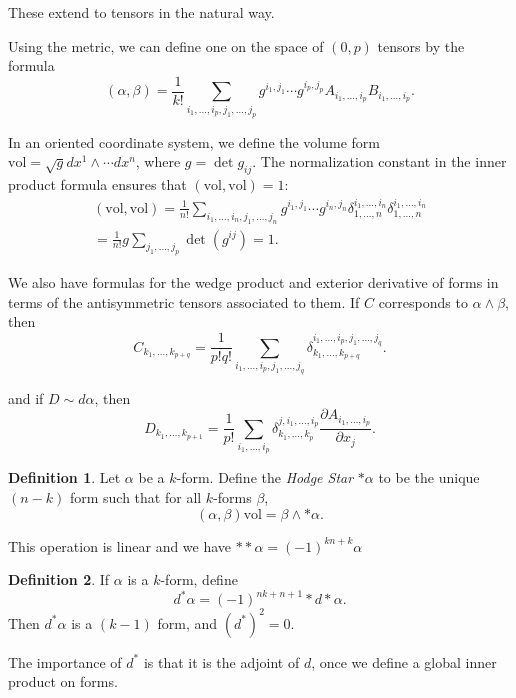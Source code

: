 \documentclass[12pt, reqno]{extarticle}
\theoremstyle{plain}
\theoremstyle{definition}
\newtheorem{definition}{Definition}[section]
\theoremstyle{remark}
\begin{document}
These extend to tensors in the natural way.

Using the metric, we can define one on the space of $(0,p)$ tensors by the formula
\[
    (\alpha,\beta) = \frac{1}{k!}\sum_{i_1, \dots, i_p, j_1, \dots, j_p}g^{i_1, j_1}\cdots g^{i_p, j_p}
    A_{i_1, \dots, i_p}B_{i_1, \dots, i_p}.
\]

In an oriented coordinate system, we define the volume form $\text{vol} = \sqrt{g}dx^1 \wedge
\cdots dx^n$, where $g = \det{g_{ij}}$. The normalization constant in the inner product formula ensures that 
$(\text{vol},\text{vol}) = 1$:
\begin{align*}
    (\text{vol}, \text{vol}) = \frac{1}{n!}\sum_{i_1, \dots, i_n, j_1, \dots, j_n}g^{i_1, j_1}\cdots g^{i_n, j_n}
    \delta_{1, \dots, n}^{i_1,\dots, i_n} \delta_{1,\dots,n}^{i_1,\dots, i_n}\\
    = \frac{1}{n!}g \sum_{j_1, \dots, j_p}\det(g^{ij}) = 1.
\end{align*}

We also have formulas for the wedge product and exterior derivative of forms in terms 
of the antisymmetric tensors associated to them. If $C$ corresponds to $\alpha\wedge\beta$, then
\[
    C_{k_1,\dots, k_{p+q}} = \frac{1}{p!q!}\sum_{i_1,\dots, i_p, j_1, \dots, j_q}
    \delta_{k_1, \dots, k_{p+q}}^{i_1,\dots, i_p, j_1,\dots, j_q}.
\]

and if $D \sim d\alpha$, then
\[
    D_{k_1, \dots, k_{p+1}} = \frac{1}{p!}\sum_{i_1, \dots, i_p}\delta^{j,i_1,\dots,i_p}_{k_1,\dots, k_p}
    \frac{\partial A_{i_1,\dots, i_p}}{\partial x_j}.
\]

\begin{definition}
    Let $\alpha$ be a $k$-form. Define the \textit{Hodge Star} $*\alpha$ to be the unique
    $(n-k)$ form such that for all $k$-forms $\beta$, 
    \[
        (\alpha,\beta)\text{vol} = \beta \wedge *\alpha.
    \]
\end{definition}

This operation is linear and we have $**\alpha = (-1)^{kn + k}\alpha$

\begin{definition}
    If $\alpha$ is a $k$-form, define 
    \[
        d^*\alpha = (-1)^{nk + n + 1}*d*\alpha.
    \]
    Then $d^*\alpha$ is a $(k-1)$ form, and $(d^*)^2 = 0$.
\end{definition}

The importance of $d^*$ is that it is the adjoint of $d$, once we define a global inner product 
on forms.
\end{document}
